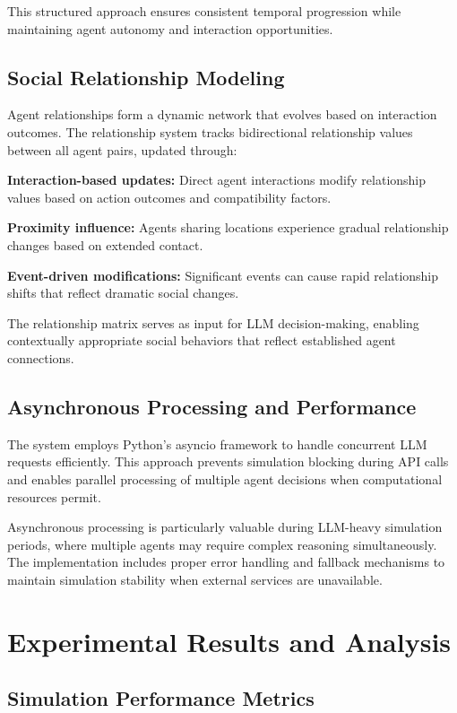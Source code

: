 \documentclass[conference]{IEEEtran}
\begin{document}
This structured approach ensures consistent temporal progression while maintaining agent autonomy and interaction opportunities.

\subsection{Social Relationship Modeling}

Agent relationships form a dynamic network that evolves based on interaction outcomes. The relationship system tracks bidirectional relationship values between all agent pairs, updated through:

\textbf{Interaction-based updates:} Direct agent interactions modify relationship values based on action outcomes and compatibility factors.

\textbf{Proximity influence:} Agents sharing locations experience gradual relationship changes based on extended contact.

\textbf{Event-driven modifications:} Significant events can cause rapid relationship shifts that reflect dramatic social changes.

The relationship matrix serves as input for LLM decision-making, enabling contextually appropriate social behaviors that reflect established agent connections.

\subsection{Asynchronous Processing and Performance}

The system employs Python's asyncio framework to handle concurrent LLM requests efficiently. This approach prevents simulation blocking during API calls and enables parallel processing of multiple agent decisions when computational resources permit.

Asynchronous processing is particularly valuable during LLM-heavy simulation periods, where multiple agents may require complex reasoning simultaneously. The implementation includes proper error handling and fallback mechanisms to maintain simulation stability when external services are unavailable.

\section{Experimental Results and Analysis}

\subsection{Simulation Performance Metrics}
\end{document}
